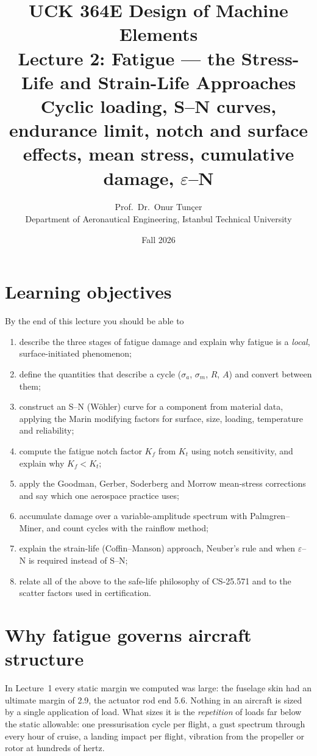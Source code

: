 \documentclass[11pt,a4paper]{article}
\title{\textbf{UCK 364E Design of Machine Elements}\\[4pt]
\Large Lecture 2: Fatigue --- the Stress-Life and Strain-Life Approaches\\[2pt]
\large Cyclic loading, S--N curves, endurance limit, notch and surface effects, mean stress, cumulative damage, $\varepsilon$--N}
\author{Prof.\ Dr.\ Onur Tunçer\\ Department of Aeronautical Engineering, Istanbul Technical University}
\date{Fall 2026}
\begin{document}
\maketitle

\section*{Learning objectives}
By the end of this lecture you should be able to
\begin{enumerate}[nosep]
  \item describe the three stages of fatigue damage and explain why fatigue is a \emph{local}, surface-initiated phenomenon;
  \item define the quantities that describe a cycle ($\sigma_a$, $\sigma_m$, $R$, $A$) and convert between them;
  \item construct an S--N (W\"ohler) curve for a component from material data, applying the Marin modifying factors for surface, size, loading, temperature and reliability;
  \item compute the fatigue notch factor $K_f$ from $K_t$ using notch sensitivity, and explain why $K_f<K_t$;
  \item apply the Goodman, Gerber, Soderberg and Morrow mean-stress corrections and say which one aerospace practice uses;
  \item accumulate damage over a variable-amplitude spectrum with Palmgren--Miner, and count cycles with the rainflow method;
  \item explain the strain-life (Coffin--Manson) approach, Neuber's rule and when $\varepsilon$--N is required instead of S--N;
  \item relate all of the above to the safe-life philosophy of CS-25.571 and to the scatter factors used in certification.
\end{enumerate}

\section{Why fatigue governs aircraft structure}

In Lecture~1 every static margin we computed was large: the fuselage skin had an ultimate margin of 2.9, the actuator rod end 5.6. Nothing in an aircraft is sized by a single application of load. What sizes it is the \emph{repetition} of loads far below the static allowable: one pressurisation cycle per flight, a gust spectrum through every hour of cruise, a landing impact per flight, vibration from the propeller or rotor at hundreds of hertz.
\end{document}
